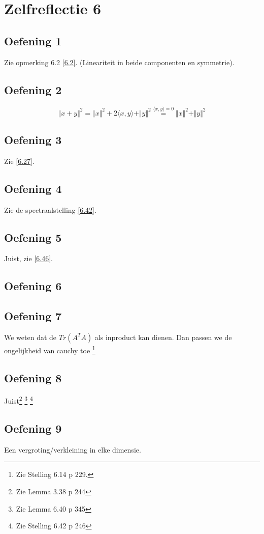 \documentclass[lineaire_algebra_oplossingen.tex]{subfiles}
\begin{document}
\section{Zelfreflectie 6}
\subsection{Oefening 1}
Zie opmerking 6.2 \ref{6.2}. (Lineariteit in beide componenten en symmetrie).

\subsection{Oefening 2}
\[
\Vert x+y \Vert^2 = \Vert x\Vert^2 + 2\langle x,y \rangle+ \Vert y\Vert^2 \overset{\langle x,y \rangle = 0}{=}\Vert x\Vert^2 + \Vert y\Vert^2
\]

\subsection{Oefening 3}
Zie \ref{6.27}.

\subsection{Oefening 4}
Zie de spectraalstelling \ref{6.42}.

\subsection{Oefening 5}
Juist, zie \ref{6.46}.

\subsection{Oefening 6}

\subsection{Oefening 7}
We weten dat de $Tr(A^T A)$ als inproduct kan dienen. Dan passen we de ongelijkheid van cauchy toe \footnote{Zie Stelling 6.14 p 229.}

\subsection{Oefening 8}
Juist\footnote{Zie Lemma 3.38 p 244} \footnote{Zie Lemma 6.40 p 345} \footnote{Zie Stelling 6.42 p 246}

\subsection{Oefening 9}
Een vergroting/verkleining in elke dimensie.
\end{document}
